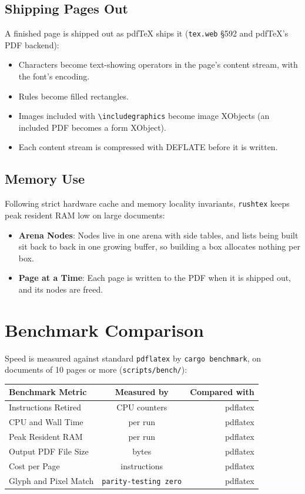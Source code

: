 \documentclass[11pt, a4paper]{article}
\begin{document}
\subsection{Shipping Pages Out}
A finished page is shipped out as pdfTeX ships it (\texttt{tex.web} \S592 and pdfTeX's PDF backend):
\begin{itemize}
\item Characters become text-showing operators in the page's content stream, with the font's encoding.
\item Rules become filled rectangles.
\item Images included with \verb|\includegraphics| become image XObjects (an included PDF becomes a form XObject).
\item Each content stream is compressed with DEFLATE before it is written.
\end{itemize}

\subsection{Memory Use}
Following strict hardware cache and memory locality invariants, \texttt{rushtex} keeps peak resident RAM low on large documents:
\begin{itemize}
\item \textbf{Arena Nodes}: Nodes live in one arena with side tables, and lists being built sit back to back in one growing buffer, so building a box allocates nothing per box.
\item \textbf{Page at a Time}: Each page is written to the PDF when it is shipped out, and its nodes are freed.
\end{itemize}

\section{Benchmark Comparison}
Speed is measured against standard \texttt{pdflatex} by \texttt{cargo benchmark}, on documents of 10 pages or more (\texttt{scripts/bench/}):

\medskip

\begin{tabular}{|l|c|r|}
\hline
\textbf{Benchmark Metric} & \textbf{Measured by} & \textbf{Compared with} \\
\hline
Instructions Retired & CPU counters & pdflatex \\
CPU and Wall Time & per run & pdflatex \\
Peak Resident RAM & per run & pdflatex \\
Output PDF File Size & bytes & pdflatex \\
Cost per Page & instructions & pdflatex \\
Glyph and Pixel Match & \texttt{parity-testing zero} & pdflatex \\
\hline
\end{tabular}
\end{document}

